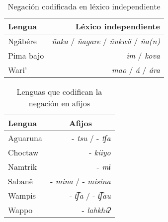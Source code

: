 \begin{table}[htbp]
\centering
\begin{tabular}{lr}
\textbf{Lengua} & \textbf{Léxico independiente} \\
\hline
Ngäbére & {\setmainfont{Charis SIL} \textit{ñaka}} / {\setmainfont{Charis SIL} \textit{ñagare}} / {\setmainfont{Charis SIL} \textit{ñukwä}} / {\setmainfont{Charis SIL} \textit{ña(n)}} \\
Pima bajo & {\setmainfont{Charis SIL} \textit{im}} / {\setmainfont{Charis SIL} \textit{kova}} \\
Wari' & {\setmainfont{Charis SIL} \textit{mao}} / {\setmainfont{Charis SIL} \textit{á}} / {\setmainfont{Charis SIL} \textit{ára}} \\
\hline
\end{tabular}
\caption{Negación codificada en léxico independiente}
\label{cuadro7}
\end{table}

\begin{table}[htbp]
\centering
\begin{tabular}{lr}
\textbf{Lengua} & \multicolumn{1}{c}{\textbf{Afijos}} \\
\hline
Aguaruna & -{\setmainfont{Charis SIL} \textit{tsu}} / -{\setmainfont{Charis SIL} \textit{tʃa}} \\
Choctaw & -{\setmainfont{Charis SIL} \textit{kiiyo}} \\
Namtrik & -{\setmainfont{Charis SIL} \textit{mɨ}} \\
Sabanê & -{\setmainfont{Charis SIL} \textit{mina}} / -{\setmainfont{Charis SIL} \textit{misina}} \\
Wampis & -{\setmainfont{Charis SIL} \textit{t͡ʃa}} / -{\setmainfont{Charis SIL} \textit{t͡ʃau}} \\
Wappo & -{\setmainfont{Charis SIL} \textit{lahkhiʔ}} \\
\hline
\end{tabular}
\caption{Lenguas que codifican la negación en afijos}
\label{cuadro8}
\end{table}

